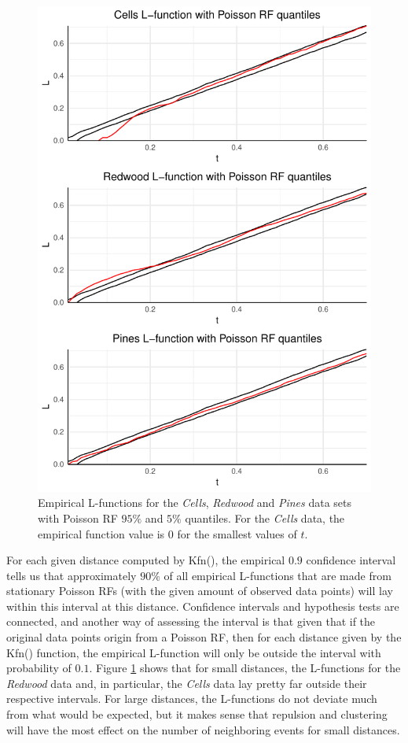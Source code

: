 \begin{figure}
    \centering
    \includegraphics[scale=0.95]{figures/prob1_quantiles.pdf}
    \caption{Empirical L-functions for the \textit{Cells}, \textit{Redwood} and \textit{Pines} data sets with Poisson RF $95\%$ and $5\%$ quantiles. For the \textit{Cells} data, the empirical function value is $0$ for the smallest values of $t$.}
    \label{fig:poiss_quantiles}
\end{figure}

For each given distance computed by Kfn(), the empirical $0.9$ confidence interval tells us that approximately $90\%$ of all empirical L-functions that are made from stationary Poisson RFs (with the given amount of observed data points) will lay within this interval at this distance. Confidence intervals and hypothesis tests are connected, and another way of assessing the interval is that given that if the original data points origin from a Poisson RF, then for each distance given by the Kfn() function, the empirical L-function will only be outside the interval with probability of $0.1$. Figure \ref{fig:poiss_quantiles} shows that for small distances, the L-functions for the \textit{Redwood} data and, in particular, the \textit{Cells} data lay pretty far outside their respective intervals. For large distances, the L-functions do not deviate much from what would be expected, but it makes sense that repulsion and clustering will have the most effect on the number of neighboring events for small distances.

